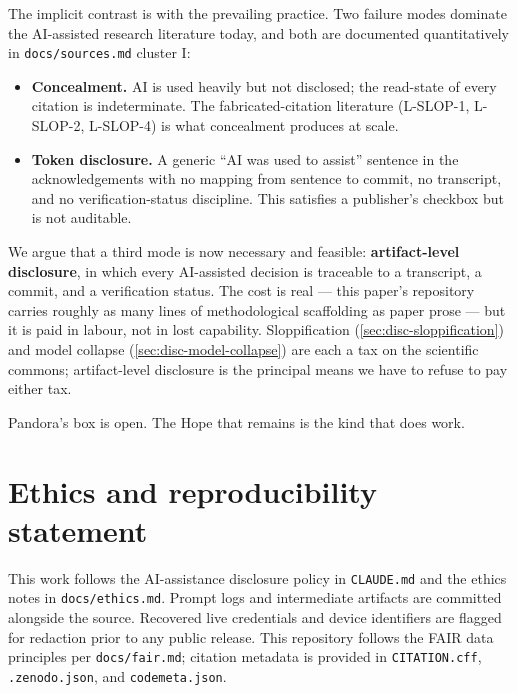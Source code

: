 \documentclass[11pt,a4paper]{article}
\begin{document}
The implicit contrast is with the prevailing practice. Two failure
modes dominate the AI-assisted research literature today, and both
are documented quantitatively in \texttt{docs/sources.md} cluster I:
\begin{itemize}
  \item \textbf{Concealment.} AI is used heavily but not disclosed;
        the read-state of every citation is indeterminate. The
        fabricated-citation literature (L-SLOP-1, L-SLOP-2,
        L-SLOP-4) is what concealment produces at scale.
  \item \textbf{Token disclosure.} A generic ``AI was used to assist''
        sentence in the acknowledgements with no mapping from sentence
        to commit, no transcript, and no verification-status
        discipline. This satisfies a publisher's checkbox but is not
        auditable.
\end{itemize}
We argue that a third mode is now necessary and feasible:
\textbf{artifact-level disclosure}, in which every AI-assisted
decision is traceable to a transcript, a commit, and a verification
status. The cost is real --- this paper's repository carries roughly
as many lines of methodological scaffolding as paper prose --- but it
is paid in labour, not in lost capability. Sloppification
(\cref{sec:disc-sloppification}) and model collapse
(\cref{sec:disc-model-collapse}) are each a tax on the scientific
commons; artifact-level disclosure is the principal means we have to
refuse to pay either tax.

Pandora's box is open. The Hope that remains is the kind that does
work.

\section*{Ethics and reproducibility statement}
\label{sec:ethics-statement}
This work follows the AI-assistance disclosure policy in
\texttt{CLAUDE.md} and the ethics notes in
\texttt{docs/ethics.md}. Prompt logs and intermediate artifacts are
committed alongside the source. Recovered live credentials and device
identifiers are flagged for redaction prior to any public release.
This repository follows the FAIR data principles per
\texttt{docs/fair.md}; citation metadata is provided in
\texttt{CITATION.cff}, \texttt{.zenodo.json}, and \texttt{codemeta.json}.



\end{document}
